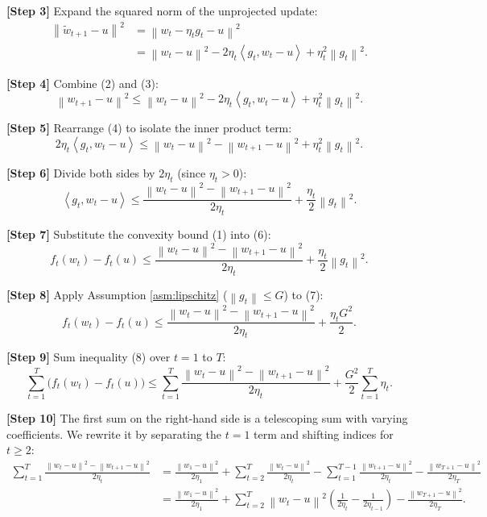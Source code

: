 \documentclass{article}
\newcommand{\norm}[1]{\left\| #1 \right\|}
\newcommand{\inner}[2]{\left\langle #1, #2 \right\rangle}
\newcommand{\step}[1]{\textbf{[Step #1]}}
\begin{document}
\step{3} Expand the squared norm of the unprojected update:
\begin{align}
    \norm{\tilde{w}_{t+1} - u}^2 &= \norm{w_t - \eta_t g_t - u}^2 \\
    &= \norm{w_t - u}^2 - 2\eta_t \inner{g_t}{w_t - u} + \eta_t^2 \norm{g_t}^2. \tag{3}
\end{align}

\step{4} Combine (2) and (3):
\begin{equation}
    \norm{w_{t+1} - u}^2 \le \norm{w_t - u}^2 - 2\eta_t \inner{g_t}{w_t - u} + \eta_t^2 \norm{g_t}^2. \tag{4}
\end{equation}

\step{5} Rearrange (4) to isolate the inner product term:
\begin{equation}
    2\eta_t \inner{g_t}{w_t - u} \le \norm{w_t - u}^2 - \norm{w_{t+1} - u}^2 + \eta_t^2 \norm{g_t}^2. \tag{5}
\end{equation}

\step{6} Divide both sides by $2\eta_t$ (since $\eta_t > 0$):
\begin{equation}
    \inner{g_t}{w_t - u} \le \frac{\norm{w_t - u}^2 - \norm{w_{t+1} - u}^2}{2\eta_t} + \frac{\eta_t}{2} \norm{g_t}^2. \tag{6}
\end{equation}

\step{7} Substitute the convexity bound (1) into (6):
\begin{equation}
    f_t(w_t) - f_t(u) \le \frac{\norm{w_t - u}^2 - \norm{w_{t+1} - u}^2}{2\eta_t} + \frac{\eta_t}{2} \norm{g_t}^2. \tag{7}
\end{equation}

\step{8} Apply Assumption \ref{asm:lipschitz} ($\norm{g_t} \le G$) to (7):
\begin{equation}
    f_t(w_t) - f_t(u) \le \frac{\norm{w_t - u}^2 - \norm{w_{t+1} - u}^2}{2\eta_t} + \frac{\eta_t G^2}{2}. \tag{8}
\end{equation}

\step{9} Sum inequality (8) over $t = 1$ to $T$:
\begin{equation}
    \sum_{t=1}^T \bigl( f_t(w_t) - f_t(u) \bigr) \le \sum_{t=1}^T \frac{\norm{w_t - u}^2 - \norm{w_{t+1} - u}^2}{2\eta_t} + \frac{G^2}{2} \sum_{t=1}^T \eta_t. \tag{9}
\end{equation}

\step{10} The first sum on the right-hand side is a telescoping sum with varying coefficients. We rewrite it by separating the $t=1$ term and shifting indices for $t \ge 2$:
\begin{align}
    \sum_{t=1}^T \frac{\norm{w_t - u}^2 - \norm{w_{t+1} - u}^2}{2\eta_t}
    &= \frac{\norm{w_1 - u}^2}{2\eta_1} + \sum_{t=2}^T \frac{\norm{w_t - u}^2}{2\eta_t} - \sum_{t=1}^{T-1} \frac{\norm{w_{t+1} - u}^2}{2\eta_t} - \frac{\norm{w_{T+1} - u}^2}{2\eta_T} \\
    &= \frac{\norm{w_1 - u}^2}{2\eta_1} + \sum_{t=2}^T \norm{w_t - u}^2 \left( \frac{1}{2\eta_t} - \frac{1}{2\eta_{t-1}} \right) - \frac{\norm{w_{T+1} - u}^2}{2\eta_T}. \tag{10}
\end{align}
\end{document}
